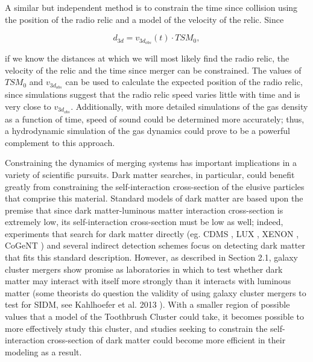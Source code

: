 \documentclass[12 pt]{article}
\renewcommand{\baselinestretch}{2}
\begin{document}
A similar but independent method is to constrain the time since collision using the position of the radio relic and a model of the velocity of the relic. Since

\renewcommand{\baselinestretch}{1}
\begin{equation}
\label{distance}
d_{3d} = v_{3d_{obs}}(t) \cdot TSM_0, 
\end{equation}
\renewcommand{\baselinestretch}{2}

if we know the distances at which we will most likely find the radio relic, the velocity of the relic and the time since merger can be constrained. The values of $TSM_0$ and $v_{3d_{obs}}$ can be used to calculate the expected position of the radio relic, since simulations suggest that the radio relic speed varies little with time and is very close to $v_{3d_{obs}}$. Additionally, with more detailed simulations of the gas density as a function of time, speed of sound could be determined more accurately; thus, a hydrodynamic simulation of the gas dynamics could prove to be a powerful complement to this approach.

Constraining the dynamics of merging systems has important implications in a variety of scientific pursuits. Dark matter searches, in particular, could benefit greatly from constraining the self-interaction cross-section of the elusive particles that comprise this material. Standard models of dark matter are based upon the premise that since dark matter-luminous matter interaction cross-section is extremely low, its self-interaction cross-section must be low as well; indeed, experiments that search for dark matter directly (eg. CDMS \cite{CDMS}, LUX \cite{LUX}, XENON \cite{XENON}, CoGeNT \cite{cogent}) and several indirect detection schemes focus on detecting dark matter that fits this standard description. However, as described in Section 2.1, galaxy cluster mergers show promise as laboratories in which to test whether dark matter may interact with itself more strongly than it interacts with luminous matter (some theorists do question the validity of using galaxy cluster mergers to test for SIDM, see Kahlhoefer et al. 2013 \cite{Kahlhoefer13}). With a smaller region of possible values that a model of the Toothbrush Cluster could take, it becomes possible to more effectively study this cluster, and studies seeking to constrain the self-interaction cross-section of dark matter could become more efficient in their modeling as a result. 
\end{document}
